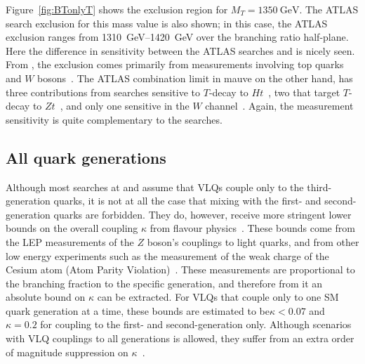 Figure~\ref{fig:BTonlyT} shows the \contur exclusion region for
$M_T = \SI{1350}{\GeV}$.  The ATLAS search exclusion for this mass value is also shown; in
this case, the ATLAS exclusion ranges from \SIrange{1310}{1420}{\GeV} over the
branching ratio half-plane. Here the difference in sensitivity between the ATLAS searches and \contur is nicely seen. From \contur, the exclusion comes primarily from measurements involving top quarks and $W$ bosons~\cite{Aaboud:2017fye,Aaboud:2018eqg,Sirunyan:2018wem,Khachatryan:2016mnb,Sirunyan:2018ptc}. The ATLAS combination limit in mauve on the other hand, has three contributions from searches sensitive to $T$-decay to $Ht$~\cite{HbbSearch,TriLepSearch,HadSearch}, two that target $T$-decay to $Zt$~\cite{ZnunuSearch,ZllSearch}, and only one sensitive in the $W$ channel~\cite{WbSearch}. Again, the measurement sensitivity is quite complementary to the searches.

\subsection{All quark generations}
Although most searches at \ATLAS and \CMS assume that VLQs couple only to the third-generation quarks, it is not at all the case that mixing with the first- and second-generation quarks are forbidden. They do, however, receive more stringent lower bounds on the overall coupling $\kappa$ from flavour physics~\cite{Buchkremer_2013}. These bounds come from the LEP measurements of the $Z$ boson's couplings to light quarks, and from other low energy experiments such as the measurement of the weak charge of the Cesium atom (Atom Parity Violation)~\cite{}. These measurements are proportional to the branching fraction to the specific generation, and therefore from it an absolute bound on $\kappa$ can be extracted. For VLQs that couple only to one SM quark generation at a time, these bounds are estimated to be$\kappa<0.07$ and $\kappa=0.2$ for coupling to the first- and second-generation only. Although scenarios with VLQ couplings to all generations is allowed, they suffer from an extra order of magnitude suppression on $\kappa$~\cite{}. 

